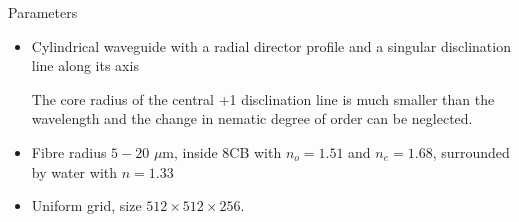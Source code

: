\documentclass[8pt]{beamer}
\newlength{\wideitemsep}
\let\olditem\item
\renewcommand{\item}{\setlength{\itemsep}{\wideitemsep}\olditem}
\newcommand{\blockpadding}{
  \rule[-0.6ex]{0pt}{2.5ex}
}
\begin{document}
\begin{columns}[t]
\begin{column}{.36\textwidth}
\begin{block}{\blockpadding Parameters}
\begin{itemize}
\item Cylindrical waveguide with a radial director profile and a singular disclination line along its axis \\
\begin{figure}[h]
\centering
{}
\end{figure}
The core radius of the central +1 disclination line is much smaller than the wavelength and the change in nematic degree of order can be neglected. 
\item Fibre radius $5 - 20$ $\mu$m, inside 8CB with $n_o = 1.51$ and $n_e = 1.68$, surrounded by water with $n = 1.33$
\item Uniform grid, size $512 \times 512 \times 256$.

 \end{itemize}
 \end{block}


 \end{column}
 

\end{columns}
\end{document}
